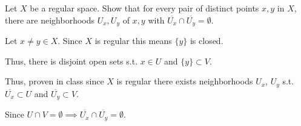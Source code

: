 \documentclass[12pt, letterpaper]{article}
\begin{document}
\color{\TextColor}
\pagecolor{\colormode}
\setlength{\parindent}{0pt}
\pagestyle{fancy}
\fancyhf{}
\fancyhead[ROE]{\color{\TextColor}\thepage}

\begin{problem}{}
    Let $X$ be a regular space. Show that for every pair of distinct
points $x, y$ in $X$, there are neighborhoods $U_x, U_y$ of $x, y$
with $\overline{U_x} \cap \overline{U_y} = \emptyset$.
\end{problem}
\begin{problemproof}
    Let $x\neq y \in X$. Since $X$ is regular this means $\{y\}$ is closed.

    Thus, there is disjoint open sets s.t. $x \in U$ and $\{y\} \subset V$.

    Thus, proven in class since $X$ is regular there exists neighborhoods $U_x$, $U_y$ s.t. $\overline{U_x} \subset U$ and $\overline{U_y} \subset V$.

    Since $U \cap V = \emptyset \implies \overline{U_x} \cap \overline{U_y} = \emptyset$.
\end{problemproof}
\end{document}
